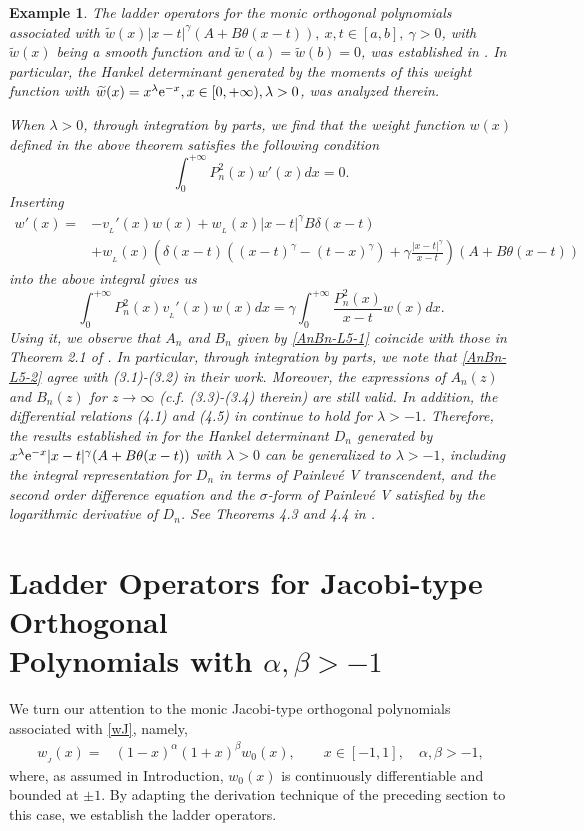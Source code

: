 \documentclass[12pt,a4paper]{article}    %
\newcommand{\e}{{\rm e}}
\newtheorem{exm}{Example}
\numberwithin{equation}{section}
\begin{document}
\begin{exm}\label{L-FH}
The ladder operators for the monic orthogonal polynomials associated with $\widetilde{w}(x)|x-t|^{\gamma}(A+B\theta(x-t)),~ x,t\in[a,b],~\gamma>0$,
with $\widetilde{w}(x)$ being a smooth function and $\widetilde{w}(a)=\widetilde{w}(b)=0$, was established in \cite{MinChenRMTA}.
In particular, the Hankel determinant generated by the moments of this weight function with $\widetilde{w}(x)=x^{\lambda}\e^{-x}, x\in[0,+\infty),\lambda>0$, was analyzed therein.

When $\lambda>0$, through integration by parts, we find that the weight function $w(x)$ defined in the above theorem satisfies the following condition
\[\int_0^{+\infty}P_n^2(x)w'(x)dx=0.\]
Inserting
\begin{align*}
w'(x)=&-v_{_L}'(x)w(x)+w_{_L}(x)|x-t|^{\gamma}B\delta(x-t)\\
&+w_{_L}(x)\left(\delta(x-t)((x-t)^{\gamma}-(t-x)^{\gamma})+\gamma\frac{|x-t|^{\gamma}}{x-t}\right)(A+B\theta(x-t))
\end{align*}
into the above integral gives us
\[\int_0^{+\infty}P_n^2(x)v_{_L}'(x)w(x)dx=\gamma\int_0^{+\infty}\frac{P_n^2(x) }{x-t}w(x)dx.\]
Using it,  we observe that $A_n$ and $B_n$ given by \eqref{AnBn-L5-1} coincide with those in Theorem 2.1 of \cite{MinChenRMTA}. In particular, through integration by parts, we note that \eqref{AnBn-L5-2} agree with (3.1)-(3.2) in their work. Moreover, the expressions of $A_n(z)$ and $B_n(z)$ for $z\rightarrow\infty$ (c.f. (3.3)-(3.4) therein) are still valid.  In addition, the differential relations (4.1) and (4.5) in \cite{MinChenRMTA} continue to hold for $\lambda>-1$. Therefore, the results established in \cite{MinChenRMTA} for the Hankel determinant $D_n$ generated by $x^{\lambda}\e^{-x}|x-t|^{\gamma}(A+B\theta(x-t))$ with $\lambda>0$ can be generalized to $\lambda>-1$, including the integral representation for $D_n$ in terms of Painlev\'{e} V transcendent, and the second order difference equation and the $\sigma$-form of Painlev\'{e} V satisfied by the logarithmic derivative of $D_n$. See Theorems 4.3 and 4.4 in \cite{MinChenRMTA}.
\end{exm}

\section{Ladder Operators for Jacobi-type Orthogonal\\ Polynomials with $\alpha,\beta>-1$}
We turn our attention to the monic Jacobi-type orthogonal polynomials associated with \eqref{wJ}, namely,
\begin{align*}
w_{_{J}}(x)=&(1-x)^{\alpha}(1+x)^{\beta}w_0(x),\qquad x\in[-1,1],\quad\alpha,\beta>-1,
\end{align*}
where, as assumed in Introduction, $w_0(x)$ is continuously differentiable and bounded at $\pm1$.
By adapting the derivation technique of the preceding section to this case, we establish the ladder operators.
\end{document}

